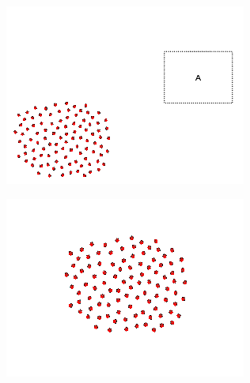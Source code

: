 \begin{minipage}{\linewidth}
	\centering	
	\begin{minipage}{0.42\linewidth}
		\includegraphics[width=\linewidth]{../ui_experiment/slide_images/Swarm_Robot_Control_-_100_Robot_0035.png}
		\label{fig:sub1}
	\end{minipage}
	\begin{minipage}{0.42\linewidth}
		\includegraphics[width=\linewidth]{../ui_experiment/slide_images/Swarm_Robot_Control_-_100_Robot_0037.png}
		\label{fig:sub2}
	\end{minipage}
	\label{fig:100_robot_slides}
\end{minipage}

